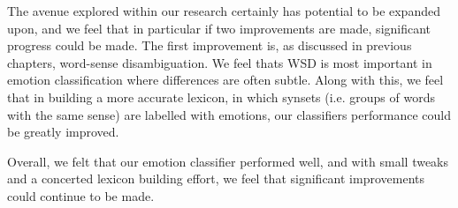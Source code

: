 The avenue explored within our research certainly has potential to be expanded upon, and we feel that in particular if two improvements are made, significant progress could be made. The first improvement is, as discussed in previous chapters, word-sense disambiguation. We feel thats WSD is most important in emotion classification where differences are often subtle. Along with this, we feel that in building a more accurate lexicon, in which synsets (i.e. groups of words with the same sense) are labelled with emotions, our classifiers performance could be greatly improved.

Overall, we felt that our emotion classifier performed well, and with small tweaks and a concerted lexicon building effort, we feel that significant improvements could continue to be made.
